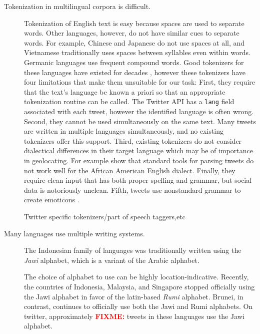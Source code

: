 \documentclass[sigconf,10pt]{acmart}
\newcommand{\str}[1]{\texttt{#1}}
\newcommand{\defn}[1]{\textit{#1}}
\newcommand{\fixme}[1]{\textcolor{red}{\textbf{FIXME:} {#1}}}
\begin{document}
\begin{description}
    \item[Tokenization in multilingual corpora is difficult.]
        Tokenization of English text is easy because spaces are used to separate words.
        Other languages, however, do not have similar cues to separate words.
        For example, Chinese and Japanese do not use spaces at all,
        and Vietnamese traditionally uses spaces between syllables even within words.
        Germanic languages use frequent compound words.
        Good tokenizers for these languages have existed for decades \citep[e.g.][]{fung1998extracting,huyen2008hybrid},
        however these tokenizers have four limitations that make them unsuitable for our task:
        First, they require that the text's language be known a priori so that an appropriate tokenization routine can be called.
        The Twitter API has a \str{lang} field associated with each tweet,
        however the identified language is often wrong.
        Second, they cannot be used simultaneously on the same text.
        Many tweets are written in multiple languages simultaneously,
        and no existing tokenizers offer this support.
        Third, existing tokenizers do not consider dialectical differences in their target language which may be of importance in geolocating.
        For example \citet{blodgett2016demographic} show that standard tools for parsing tweets do not work well for the African American English dialect.
        Finally, they require clean input that has both proper spelling and grammar,
        but social data is notoriously unclean.
        Fifth, tweets use nonstandard grammar to create emoticons \citep{}.

        Twitter specific tokenizers/part of speech taggers,etc\citep{o2010tweetmotif,gimpel2011part,owoputi2013improved}

    \item[Many languages use multiple writing systems.]
        The Indonesian family of languages was traditionally written using the \defn{Jawi} alphabet,
        which is a variant of the Arabic alphabet.

        The choice of alphabet to use can be highly location-indicative.
        Recently, the countries of Indonesia, Malaysia, and Singapore stopped officially using the Jawi alphabet in favor of the latin-based \defn{Rumi} alphabet.
        Brunei, in contrast, continues to officially use both the Jawi and Rumi alphabets.
        On twitter, approximately \fixme{} tweets in these languages use the Jawi alphabet.


\end{description}
\end{document}
